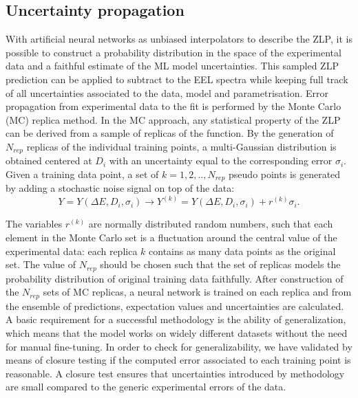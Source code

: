 \subsection{Uncertainty propagation}
With artificial neural networks as unbiased interpolators to describe the ZLP, 
it is possible to construct a probability distribution in the space of 
the experimental data and a faithful estimate of the ML model uncertainties.
%
This sampled ZLP prediction can be applied to subtract to the EEL spectra while
keeping full track of all uncertainties associated to the data, model and parametrisation.
%
Error propagation from experimental data to the fit is performed by the Monte Carlo (MC)
replica method. 
%
In the MC approach, any statistical property of the ZLP can be derived from a 
sample of replicas of the function. By the generation of $N_{rep}$ replicas 
of the individual training points, a multi-Gaussian distribution is obtained 
centered at $D_i$ with an uncertainty equal to the corresponding error $\sigma_i$. 
%
Given a training data point, a set of $k= 1,2,..,N_{rep}$ pseudo points 
is generated by adding a stochastic noise signal on top of the data: 
\begin{equation}
    Y = Y(\Delta E, D_i,\sigma_i) \rightarrow  Y^{(k)} = Y(\Delta E, D_i,\sigma_i) + r^{(k)}\sigma_i.
\end{equation} 

The variables $r^{(k)}$ are normally distributed random numbers, 
such that each element in the Monte Carlo set is a fluctuation around 
the central value of the experimental data: each replica $k$ contains 
as many data points as the original set. 
%
The value of $N_{rep}$ should be chosen such that the set of replicas 
models the probability distribution of original training data faithfully.
%
After construction of the $N_{rep}$ sets of MC replicas, a neural network is
trained on each replica and from the ensemble of predictions, expectation values
and uncertainties are calculated. \newline
%
A basic requirement for a successful methodology is the ability of generalization, 
which means that the model works on widely different datasets without 
the need for manual fine-tuning.
%
In order to check for generalizability, we have validated by means of 
closure testing\cite{Ball:2015oha} if the computed error 
associated to each training point is reasonable. 
%
A closure test ensures that uncertainties introduced by methodology are small 
compared to the generic experimental errors of the data. 
%

